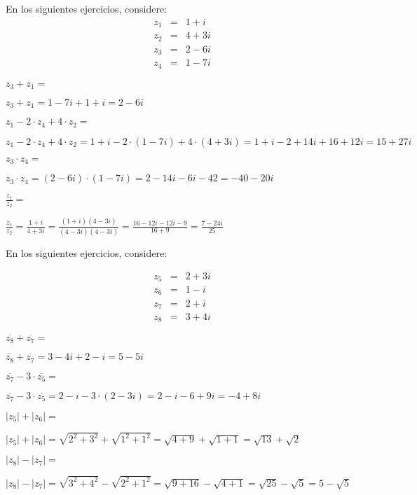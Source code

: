 \documentclass[12pt,addpoints,x11names]{exam}
\begin{document}
\begin{questions}
En los siguientes ejercicios, considere:
\begin{eqnarray*}
  z_1&=&1+i\\
  z_2&=&4+3i\\
  z_3&=&2-6i\\
  z_4&=&1-7i
\end{eqnarray*}
 
\question[3] $z_3+z_1=$
  \begin{solutionbox}{1.2in}
     $z_3+z_1=1-7i+1+i=2-6i$
  \end{solutionbox}
\question[3] $z_1-2\cdot z_4+4\cdot z_2=$
  \begin{solutionbox}{1.2in}
     $z_1-2\cdot z_4+4\cdot z_2=1+i-2\cdot(1-7i)+4\cdot(4+3i)=1+i-2+14i+16+12i=15+27i$
  \end{solutionbox}
\question[3] $z_3\cdot z_4=$
  \begin{solutionbox}{1.2in}
     $z_3\cdot z_4=(2-6i)\cdot(1-7i)=2-14i-6i-42=-40-20i$
  \end{solutionbox}
\question[3] $\frac{z_1}{z_2}=$
  \begin{solutionbox}{1.2in}
     $\frac{z_1}{z_2}=\frac{1+i}{4+3i}=\frac{(1+i)(4-3i)}{(4-3i)(4-3i)}=\frac{16-12i-12i-9}{16+9}=\frac{7-24i}{25}$
  \end{solutionbox}
\pagebreak

En los siguientes ejercicios, considere:

\begin{eqnarray*}
  z_5&=&2+3i\\
  z_6&=&1-i\\
  z_7&=&2+i\\
  z_8&=&3+4i
\end{eqnarray*}

\question[3] $\overline{z_8}+\overline{z_7}=$
   \begin{solutionbox}{1.3in}
     $\overline{z_8}+\overline{z_7}=3-4i+2-i=5-5i$
  \end{solutionbox}
\question[3] $\overline{z_7}-3\cdot\overline{z_5}=$
   \begin{solutionbox}{1.3in}
     $\overline{z_7}-3\cdot\overline{z_5}=2-i-3\cdot(2-3i)=2-i-6+9i=-4+8i$
  \end{solutionbox}
\question[3] $|z_5|+|z_6|=$
   \begin{solutionbox}{1.3in}
     $|z_5|+|z_6|=\sqrt{2^{2}+3^{2}}+\sqrt{1^{2}+1^{2}}=\sqrt{4+9}+\sqrt{1+1}=\sqrt{13}+\sqrt{2}$
  \end{solutionbox}
\question[3] $|z_8|-|z_7|=$
  \begin{solutionbox}{1.3in}
     $|z_8|-|z_7|=\sqrt{3^{2}+4^{2}}-\sqrt{2^{2}+1^{2}}=\sqrt{9+16}-\sqrt{4+1}=\sqrt{25}-\sqrt{5}=5-\sqrt{5}$
  \end{solutionbox}
\end{questions}
\end{document}
